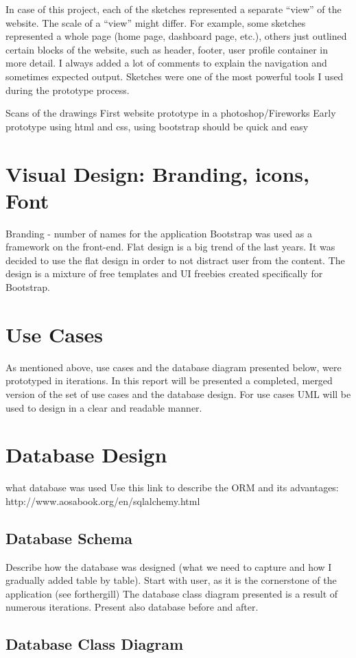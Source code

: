 In case of this project, each of the sketches represented a separate “view” of the website. The scale of a “view” might differ. For example, some sketches represented a whole page (home page, dashboard page, etc.), others just outlined certain blocks of the website, such as header, footer, user profile container in more detail. I always added a lot of comments to explain the navigation and sometimes expected output. Sketches were one of the most powerful tools I used during the prototype process. 


Scans of the drawings
First website prototype in a photoshop/Fireworks
Early prototype using html and css, using bootstrap should be quick and easy

\section{Visual Design: Branding, icons, Font}
\label{sec:visdesign_prototype}
Branding - number of names for the application
Bootstrap was used as a framework on the front-end.
Flat design is a big trend of the last years. It was decided to use the flat design in order to not distract user from the content.
The design is a mixture of free templates and UI freebies created specifically for Bootstrap.

\section{Use Cases}
\label{usecases_prototype}
As mentioned above, use cases and the database diagram presented below, were prototyped in iterations. In this report will be presented a completed, merged version of the set of use cases and the database design. For use cases UML will be used to design in a clear and readable manner.

\section{Database Design}
\label{databasedesign}
what database was used
Use this link to describe the ORM and its advantages: 
http://www.aosabook.org/en/sqlalchemy.html

\subsection{Database Schema}
Describe how the database was designed (what we need to capture and how I gradually added table by table). Start with user, as it is the cornerstone of the application (see forthergill)
The database class diagram presented is a result of numerous iterations.  
Present also database before and after.

\subsection{Database Class Diagram}

